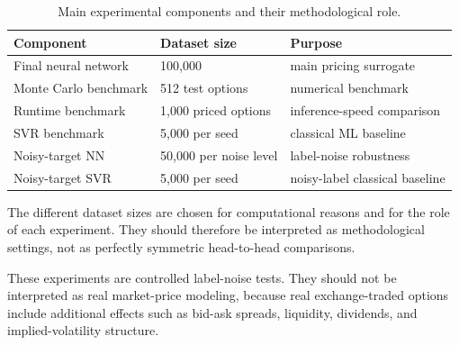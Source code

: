 \begin{table}[H]
    \centering
    \begin{tabular}{lll}
        \toprule
        Component & Dataset size & Purpose \\
        \midrule
        Final neural network & 100,000 & main pricing surrogate \\
        Monte Carlo benchmark & 512 test options & numerical benchmark \\
        Runtime benchmark & 1,000 priced options & inference-speed comparison \\
        SVR benchmark & 5,000 per seed & classical ML baseline \\
        Noisy-target NN & 50,000 per noise level & label-noise robustness \\
        Noisy-target SVR & 5,000 per seed & noisy-label classical baseline \\
        \bottomrule
    \end{tabular}
    \caption{Main experimental components and their methodological role.}
    \label{tab:methodology-experiments}
\end{table}

The different dataset sizes are chosen for computational reasons and for the role of each experiment.
They should therefore be interpreted as methodological settings, not as perfectly symmetric head-to-head comparisons.

These experiments are controlled label-noise tests.
They should not be interpreted as real market-price modeling, because real exchange-traded options include additional effects such as bid-ask spreads, liquidity, dividends, and implied-volatility structure.
